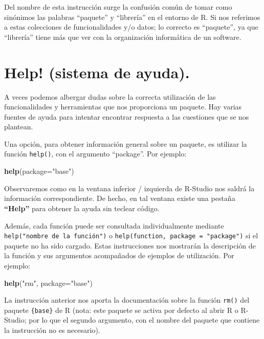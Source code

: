 \documentclass[
]{book}
\newenvironment{Shaded}{\begin{snugshade}}{\end{snugshade}}
\newcommand{\AttributeTok}[1]{\textcolor[rgb]{0.13,0.29,0.53}{#1}}
\newcommand{\FunctionTok}[1]{\textcolor[rgb]{0.13,0.29,0.53}{\textbf{#1}}}
\newcommand{\NormalTok}[1]{#1}
\newcommand{\StringTok}[1]{\textcolor[rgb]{0.31,0.60,0.02}{#1}}
\begin{document}
Del nombre de esta instrucción surge la confusión común de tomar como sinónimos las palabras ``paquete'' y ``librería'' en el entorno de R. Si nos referimos a estas colecciones de funcionalidades y/o datos; lo correcto es ``paquete'', ya que ``librería'' tiene más que ver con la organización informática de un software.

\section{Help! (sistema de ayuda).}\label{help-sistema-de-ayuda.}

A veces podemos albergar dudas sobre la correcta utilización de las funcionalidades y herramientas que nos proporciona un paquete. Hay varias fuentes de ayuda para intentar encontrar respuesta a las cuestiones que se nos plantean.

Una opción, para obtener información general sobre un paquete, es utilizar la función \texttt{help()}, con el argumento ``package''. Por ejemplo:

\begin{Shaded}
\begin{Highlighting}[]
\FunctionTok{help}\NormalTok{(}\AttributeTok{package=}\StringTok{"base"}\NormalTok{)}
\end{Highlighting}
\end{Shaded}

Observaremos como en la ventana inferior / izquierda de R-Studio nos saldrá la información correspondiente. De hecho, en tal ventana existe una pestaña \textbf{``Help''} para obtener la ayuda sin teclear código.

Además, cada función puede ser consultada individualmente mediante \texttt{help("nombre\ de\ la\ función")} o \texttt{help(function,\ package\ =\ "package")} si el paquete no ha sido cargado. Estas instrucciones nos mostrarán la descripción de la función y sus argumentos acompañados de ejemplos de utilización. Por ejemplo:

\begin{Shaded}
\begin{Highlighting}[]
\FunctionTok{help}\NormalTok{(}\StringTok{"rm"}\NormalTok{, }\AttributeTok{package=}\StringTok{"base"}\NormalTok{)}
\end{Highlighting}
\end{Shaded}

La instrucción anterior nos aporta la documentación sobre la función \texttt{rm()} del paquete \texttt{\{base\}} de R (nota: este paquete se activa por defecto al abrir R o R-Studio; por lo que el segundo argumento, con el nombre del paquete que contiene la instrucción no es necesario).
\end{document}
